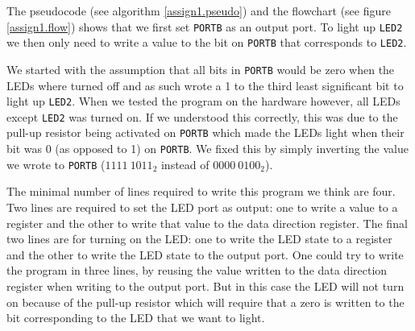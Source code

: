 The pseudocode (see algorithm \ref{assign1.pseudo}) and the flowchart (see figure \ref{assign1.flow}) shows that we first set \texttt{PORTB} as an output port. To light up \texttt{LED2} we then only need to write a value to the bit on \texttt{PORTB} that corresponds to \texttt{LED2}. 

We started with the assumption that all bits in \texttt{PORTB} would be zero when the LEDs where turned off and as such wrote a 1 to the third least significant bit to light up \texttt{LED2}. When we tested the program on the hardware however, all LEDs except \texttt{LED2} was turned on. If we understood this correctly, this was due to the pull-up resistor being activated on \texttt{PORTB} which made the LEDs light when their bit was 0 (as opposed to 1) on \texttt{PORTB}. We fixed this by simply inverting the value we wrote to \texttt{PORTB} (${1111\ 1011}_2$ instead of ${0000\ 0100}_2$).

The minimal number of lines required to write this program we think are four. Two lines are required to set the LED port as output: one to write a value to a register and the other to write that value to the data direction register. The final two lines are for turning on the LED: one to write the LED state to a register and the other to write the LED state to the output port. One could try to write the program in three lines, by reusing the value written to the data direction register when writing to the output port. But in this case the LED will not turn on because of the pull-up resistor which will require that a zero is written to the bit corresponding to the LED that we want to light.

